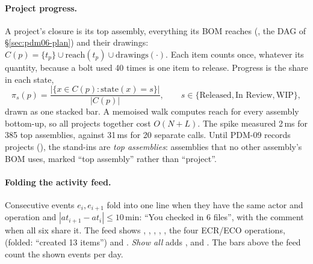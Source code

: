 \paragraph{Project progress.} A project's closure is its top assembly, everything its BOM reaches (, the DAG
of \S\ref{sec:pdm06-plan}) and their drawings: $C(p) = \{t_p\} \cup \mathrm{reach}(t_p) \cup \mathrm{drawings}(\cdot)$.
Each item counts once, whatever its quantity, because a bolt used 40 times is one item to release. Progress is the share in
each state,
\[
  \pi_s(p) = \frac{|\{x \in C(p) : \mathrm{state}(x) = s\}|}{|C(p)|}, \qquad s \in \{\text{Released}, \text{In Review}, \text{WIP}\},
\]
drawn as one stacked bar. A memoised walk computes $\mathrm{reach}$ for every assembly bottom-up, so all projects together
cost $O(N + L)$. The spike measured 2\,ms for 385 top assemblies, against 31\,ms for 20 separate
 calls. Until PDM-09 records projects (), the stand-ins are \emph{top assemblies}:
assemblies that no other assembly's BOM uses, marked ``top assembly'' rather than ``project''.

\paragraph{Folding the activity feed.} Consecutive events $e_i, e_{i+1}$ fold into one line when they have the same actor
and operation and $|\mathit{at}_{i+1} - \mathit{at}_i| \le 10$\,min: ``You checked in 6 files'', with the comment when all
six share it. The feed shows , , , , , the four ECR/ECO
operations,  (folded: ``created 13 items'') and . \emph{Show all} adds
,  and . The bars above the feed count the shown events per day.


